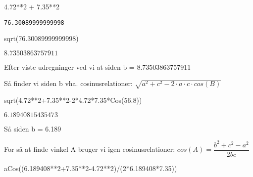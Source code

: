 \documentclass[
  a4paper,
]{article}
\newenvironment{Shaded}{\begin{snugshade}}{\end{snugshade}}
\newcommand{\DecValTok}[1]{\textcolor[rgb]{0.68,0.00,0.00}{#1}}
\newcommand{\FloatTok}[1]{\textcolor[rgb]{0.68,0.00,0.00}{#1}}
\newcommand{\NormalTok}[1]{\textcolor[rgb]{0.00,0.23,0.31}{#1}}
\newcommand{\OperatorTok}[1]{\textcolor[rgb]{0.37,0.37,0.37}{#1}}
\begin{document}
\begin{Shaded}
\begin{Highlighting}[]
\FloatTok{4.72}\OperatorTok{**}\DecValTok{2} \OperatorTok{+} \FloatTok{7.35}\OperatorTok{**}\DecValTok{2}
\end{Highlighting}
\end{Shaded}

\begin{verbatim}
76.30089999999998
\end{verbatim}

\begin{Shaded}
\begin{Highlighting}[]
\NormalTok{sqrt(}\FloatTok{76.30089999999998}\NormalTok{)}
\end{Highlighting}
\end{Shaded}

$\displaystyle 8.73503863757911$

Efter viste udregninger ved vi at siden b = 8.73503863757911

Så finder vi siden b vha. cosinusrelationer:
\(\sqrt{a^2 + c^2 - 2 \cdot a \cdot c \cdot cos(B)}\)

\begin{Shaded}
\begin{Highlighting}[]
\NormalTok{sqrt(}\FloatTok{4.72}\OperatorTok{**}\DecValTok{2}\OperatorTok{+}\FloatTok{7.35}\OperatorTok{**}\DecValTok{2}\OperatorTok{{-}}\DecValTok{2}\OperatorTok{*}\FloatTok{4.72}\OperatorTok{*}\FloatTok{7.35}\OperatorTok{*}\NormalTok{Cos(}\FloatTok{56.8}\NormalTok{))}
\end{Highlighting}
\end{Shaded}

$\displaystyle 6.18940815435473$

Så siden b = 6.189

For så at finde vinkel A bruger vi igen cosinusrelationer:
\(cos(A)=\dfrac{b^2 + c^2 - a^2}{2bc}\)

\begin{Shaded}
\begin{Highlighting}[]
\NormalTok{aCos((}\FloatTok{6.189408}\OperatorTok{**}\DecValTok{2}\OperatorTok{+}\FloatTok{7.35}\OperatorTok{**}\DecValTok{2}\OperatorTok{{-}}\FloatTok{4.72}\OperatorTok{**}\DecValTok{2}\NormalTok{)}\OperatorTok{/}\NormalTok{(}\DecValTok{2}\OperatorTok{*}\FloatTok{6.189408}\OperatorTok{*}\FloatTok{7.35}\NormalTok{))}
\end{Highlighting}
\end{Shaded}
\end{document}
